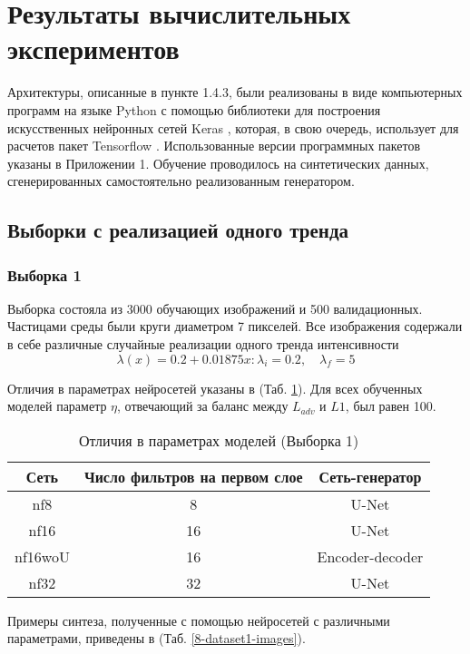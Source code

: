 \clearpage
\section{Результаты вычислительных экспериментов}
	Архитектуры, описанные в пункте 1.4.3, были реализованы в виде компьютерных программ на языке Python с помощью библиотеки для построения искусственных нейронных сетей Keras \cite{keras}, которая, в свою очередь, использует для расчетов пакет Tensorflow \cite{tf}. Использованные версии программных пакетов указаны в Приложении 1. Обучение проводилось на синтетических данных, сгенерированных самостоятельно реализованным генератором. 
	\subsection{Выборки с реализацией одного тренда}
		\subsubsection{Выборка 1}
			Выборка состояла из 3000 обучающих изображений и 500 валидационных. Частицами среды были круги диаметром 7 пикселей. Все изображения содержали в себе различные случайные реализации одного тренда интенсивности
			$$\lambda(x) = 0.2 + 0.01875x : \lambda_i = 0.2, \quad \lambda_f = 5$$
			
			Отличия в параметрах нейросетей указаны в (Таб. \ref{8-sand-trend2-nns}). Для всех обученных моделей параметр $\eta$, отвечающий за баланс между $L_{adv}$ и $L1$, был равен 100.
			
			\begin{table}[h!]
				\begin{center}
					\begin{tabular}{|c|c|c|}
						\hline
						Сеть & Число фильтров на первом слое & Сеть-генератор \\
						\hline
						nf8 & 8 & U-Net \\
						\hline
						nf16 & 16 & U-Net \\
						\hline
						nf16woU & 16 & Encoder-decoder \\
						\hline
						nf32 & 32 & U-Net \\
						\hline
					\end{tabular}
					\caption{Отличия в параметрах моделей (Выборка 1)}
					\label{8-sand-trend2-nns}
				\end{center}
			\end{table}
			
			Примеры синтеза, полученные с помощью нейросетей с различными параметрами, приведены в (Таб. \ref{8-dataset1-images}).
			
